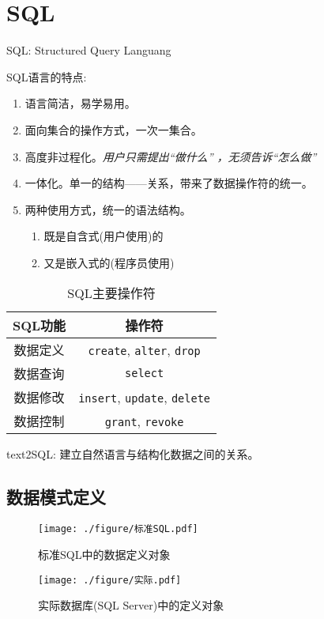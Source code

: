 \chapter{SQL}

SQL: Structured Query Languang

SQL语言的特点:
\begin{enumerate}
    \item 语言简洁，易学易用。
    \item 面向集合的操作方式，一次一集合。
    \item 高度非过程化。\textit{用户只需提出“做什么” ，无须告诉“怎么做”}
    \item 一体化。单一的结构——关系，带来了数据操作符的统一。
    \item 两种使用方式，统一的语法结构。
    \begin{enumerate}
        \item 既是自含式(用户使用)的
        \item 又是嵌入式的(程序员使用)
    \end{enumerate}
\end{enumerate}

\begin{table}[H]
  \centering
  \begin{tabular}{|c|c|}
    \hline
    \textbf{SQL功能} & \textbf{操作符} \\
    \hline
    数据定义 & \verb|create|, \verb|alter|, \verb|drop| \\
    \hline
    数据查询 & \verb|select| \\
    \hline
    数据修改 & \verb|insert|, \verb|update|, \verb|delete| \\
    \hline
    数据控制 & \verb|grant|, \verb|revoke| \\
    \hline
  \end{tabular}
  \caption{SQL主要操作符}
\end{table}

text2SQL: 建立自然语言与结构化数据之间的关系。

\section{数据模式定义}

\begin{figure}[H]
  \centering
  \begin{minipage}[t]{0.45\textwidth}
    \centering
    \texttt{[image: ./figure/标准SQL.pdf]}
    \caption{标准SQL中的数据定义对象}
  \end{minipage}
  \hfill
  \begin{minipage}[t]{0.5\textwidth}
    \centering
    \texttt{[image: ./figure/实际.pdf]}
    \caption{实际数据库(SQL Server)中的定义对象}
  \end{minipage}
\end{figure}

